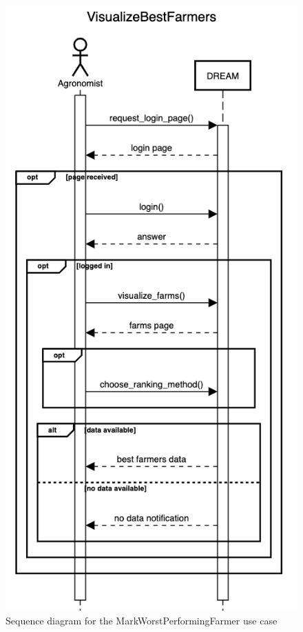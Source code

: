 \documentclass{article}
\begin{document}
\begin{figure}[H]
    \centering
	\includegraphics[scale=0.5]{sequence_diagrams/VisualizeBestFarmers}
    \caption{Sequence diagram for the MarkWorstPerformingFarmer use case}
\end{figure}
\end{document}
